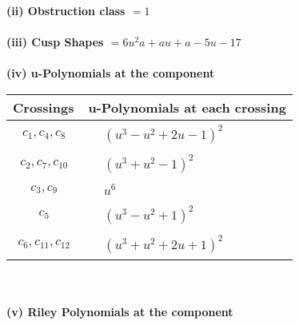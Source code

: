 \documentclass[1p]{elsarticle_modified}
\theoremstyle{definition}
\begin{document}
\flushleft \textbf{(ii) Obstruction class $= 1$}\\~\\
\flushleft \textbf{(iii) Cusp Shapes $= 6 u^2 a+a u+a-5 u-17$}\\~\\
\newpage\renewcommand{\arraystretch}{1}
\flushleft \textbf{(iv) u-Polynomials at the component}\newline \\
\begin{tabular}{m{50pt}|m{274pt}}
Crossings & \hspace{64pt}u-Polynomials at each crossing \\
\hline $$\begin{aligned}c_{1},c_{4},c_{8}\end{aligned}$$&$\begin{aligned}
&(u^3- u^2+2 u-1)^2
\end{aligned}$\\
\hline $$\begin{aligned}c_{2},c_{7},c_{10}\end{aligned}$$&$\begin{aligned}
&(u^3+u^2-1)^2
\end{aligned}$\\
\hline $$\begin{aligned}c_{3},c_{9}\end{aligned}$$&$\begin{aligned}
&u^6
\end{aligned}$\\
\hline $$\begin{aligned}c_{5}\end{aligned}$$&$\begin{aligned}
&(u^3- u^2+1)^2
\end{aligned}$\\
\hline $$\begin{aligned}c_{6},c_{11},c_{12}\end{aligned}$$&$\begin{aligned}
&(u^3+u^2+2 u+1)^2
\end{aligned}$\\
\hline
\end{tabular}\\~\\
\newpage\renewcommand{\arraystretch}{1}
\flushleft \textbf{(v) Riley Polynomials at the component}\newline \\
\end{document}
